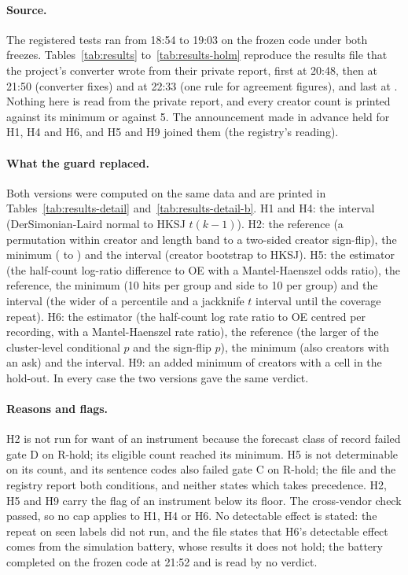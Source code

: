 \paragraph{Source.} The registered tests ran from 18:54 to 19:03 on the frozen code under both freezes.
Tables~\ref{tab:results} to~\ref{tab:results-holm} reproduce the results file that the project's converter wrote from
their private report, first at 20:48, then at 21:50 (converter fixes) and at 22:33 (one rule for agreement figures),
and last at \ResStamp. Nothing here is read
from the private report, and every creator count is printed against its minimum or against 5. \ResSummary{}
\ResCounts{} \ResWithheld{} The announcement made in advance held for H1, H4 and H6, and H5 and H9 joined them (the
registry's reading).

\paragraph{What the guard replaced.} Both versions were computed on the same data and are printed in
Tables~\ref{tab:results-detail} and~\ref{tab:results-detail-b}. H1 and H4: the interval (DerSimonian-Laird normal to
HKSJ $t(k-1)$). H2: the reference (a permutation within creator and length band to a two-sided creator sign-flip), the
minimum (\MinCreatorsOneSided{} to \MinCreatorsTwoSided) and the interval (creator bootstrap to HKSJ). H5: the estimator
(the half-count log-ratio difference to OE with a Mantel-Haenszel odds ratio), the reference, the minimum (10 hits per
group and side to 10 per group) and the interval (the wider of a percentile and a jackknife $t$ interval until the
coverage repeat). H6: the estimator (the half-count log rate ratio to OE centred per recording, with a Mantel-Haenszel
rate ratio), the reference (the larger of the cluster-level conditional $p$ and the sign-flip $p$), the minimum (also
\MinCreatorsOneSided{} creators with an ask) and the interval. H9: an added minimum of \MinCreatorsOneSided{} creators
with a cell in the hold-out. In every case the two versions gave the same verdict.

\paragraph{Reasons and flags.} H2 is not run for want of an instrument because the forecast class of record failed
gate D on R-hold; its eligible count reached its minimum. H5 is not determinable on its count, and its sentence codes
also failed gate C on R-hold; the file and the registry report both conditions, and neither states which takes
precedence. H2, H5 and H9 carry the flag of an instrument below its floor. The cross-vendor
check passed, so no cap applies to H1, H4 or H6. No detectable effect is stated: the repeat on seen labels did not run,
and the file states that H6's detectable effect comes from the simulation battery, whose results it does not hold; the
battery completed on the frozen code at 21:52 and is read by no verdict.

